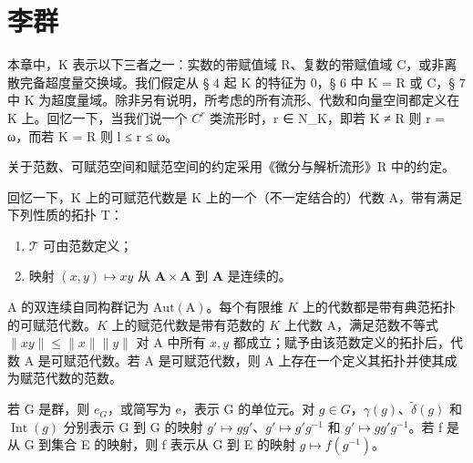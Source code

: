 \chapter{李群}

本章中，K 表示以下三者之一：实数的带赋值域 R、复数的带赋值域 C，或非离散完备超度量交换域。我们假定从 § 4 起 K 的特征为 0，§ 6 中 K = R 或 C，§ 7 中 K 为超度量域。除非另有说明，所考虑的所有流形、代数和向量空间都定义在 K 上。回忆一下，当我们说一个 \(C^{r}\) 类流形时，r ∈ N\_K，即若 K ≠ R 则 r = ω，而若 K = R 则 l ≤ r ≤ ω。

关于范数、可赋范空间和赋范空间的约定采用《微分与解析流形》R 中的约定。

回忆一下，K 上的可赋范代数是 K 上的一个（不一定结合的）代数 A，带有满足下列性质的拓扑 T：

\begin{enumerate}
\def\labelenumi{(\arabic{enumi})}
\item
  \(\mathcal{T}\) 可由范数定义；
\item
  映射 \((x,y)\mapsto xy\) 从 \(\mathbf{A}\times \mathbf{A}\) 到 \(\mathbf{A}\) 是连续的。
\end{enumerate}

A 的双连续自同构群记为 \(\mathrm{Aut(A)}\)。每个有限维 \(K\) 上的代数都是带有典范拓扑的可赋范代数。\(K\) 上的赋范代数是带有范数的 \(K\) 上代数 A，满足范数不等式 \(\| xy\| \leqslant \| x\|\| y\|\) 对 A 中所有 \(x,y\) 都成立；赋予由该范数定义的拓扑后，代数 A 是可赋范代数。若 A 是可赋范代数，则 A 上存在一个定义其拓扑并使其成为赋范代数的范数。

若 G 是群，则 \(e_{G}\)，或简写为 e，表示 G 的单位元。对 \(g \in G\)，\(\gamma(g)\)、\(\tilde{\delta}(g)\) 和 \(\operatorname{Int}(g)\) 分别表示 G 到 G 的映射 \(g' \mapsto gg'\)、\(g' \mapsto g'g^{-1}\) 和 \(g' \mapsto gg'g^{-1}\)。若 f 是从 G 到集合 E 的映射，则 f 表示从 G 到 E 的映射 \(g \mapsto f(g^{-1})\)。

